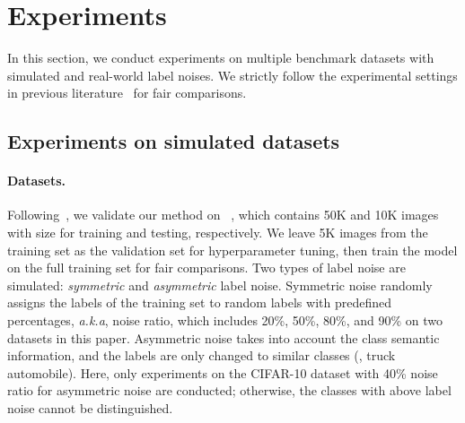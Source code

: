 \section{Experiments}
\label{sec:exp}
In this section, we conduct experiments on multiple benchmark datasets with simulated and real-world label noises. We strictly follow the experimental settings in previous literature~\cite{ortego2021multi,li2020dividemix,li2021learning,liu2020early} for fair comparisons.

\subsection{Experiments on simulated datasets}

\paragraph{Datasets.} 
Following~\cite{ortego2021multi,li2020dividemix,li2021learning,liu2020early}, we validate our method on ~\cite{krizhevsky2009learning}, which contains 50K and 10K images with size  for training and testing, respectively. We leave 5K images from the training set as the validation set for hyperparameter tuning, then train the model on the full training set for fair comparisons.
Two types of label noise are simulated: \emph{symmetric} and \emph{asymmetric} label noise. Symmetric noise randomly assigns the labels of the training set to random labels with predefined percentages, \textit{a.k.a}, noise ratio, which includes 20\%, 50\%, 80\%, and 90\% on two datasets in this paper. Asymmetric noise takes into account the class semantic information, and the labels are only changed to similar classes (\eg, truck  automobile). Here, only experiments on the CIFAR-10 dataset with 40\% noise ratio for asymmetric noise are conducted; otherwise, the classes with above  label noise cannot be distinguished.

